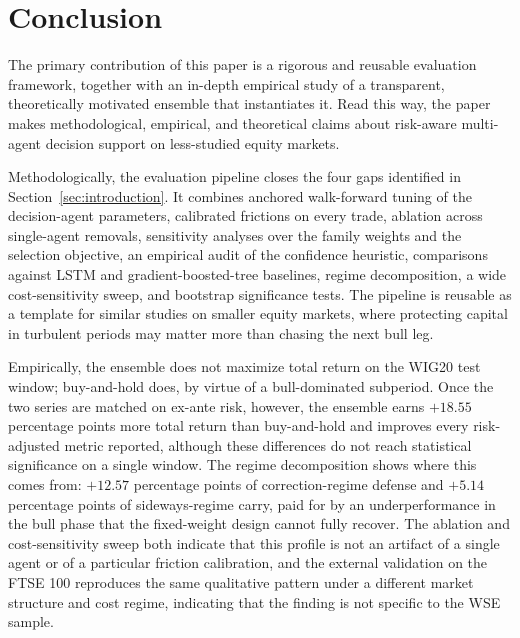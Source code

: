 \documentclass{ieeeaccess}
\newcommand{\VolScaledExcessPP}{\ensuremath{+18.55}}
\newcommand{\CorrectionDefencePP}{\ensuremath{+12.57}}
\newcommand{\SidewaysExcessPP}{\ensuremath{+5.14}}
\begin{document}
\section{Conclusion}
\label{sec:conclusion}

The primary contribution of this paper is a rigorous and reusable evaluation framework, together with an in-depth empirical study of a transparent, theoretically motivated ensemble that instantiates it. Read this way, the paper makes methodological, empirical, and theoretical claims about risk-aware multi-agent decision support on less-studied equity markets.

Methodologically, the evaluation pipeline closes the four gaps identified in Section~\ref{sec:introduction}. It combines anchored walk-forward tuning of the decision-agent parameters, calibrated frictions on every trade, ablation across single-agent removals, sensitivity analyses over the family weights and the selection objective, an empirical audit of the confidence heuristic, comparisons against LSTM and gradient-boosted-tree baselines, regime decomposition, a wide cost-sensitivity sweep, and bootstrap significance tests. The pipeline is reusable as a template for similar studies on smaller equity markets, where protecting capital in turbulent periods may matter more than chasing the next bull leg.

Empirically, the ensemble does not maximize total return on the WIG20 test window; buy-and-hold does, by virtue of a bull-dominated subperiod. Once the two series are matched on ex-ante risk, however, the ensemble earns $\VolScaledExcessPP$ percentage points more total return than buy-and-hold and improves every risk-adjusted metric reported, although these differences do not reach statistical significance on a single window. The regime decomposition shows where this comes from: $\CorrectionDefencePP$ percentage points of correction-regime defense and $\SidewaysExcessPP$ percentage points of sideways-regime carry, paid for by an underperformance in the bull phase that the fixed-weight design cannot fully recover. The ablation and cost-sensitivity sweep both indicate that this profile is not an artifact of a single agent or of a particular friction calibration, and the external validation on the FTSE 100 reproduces the same qualitative pattern under a different market structure and cost regime, indicating that the finding is not specific to the WSE sample.
\end{document}
